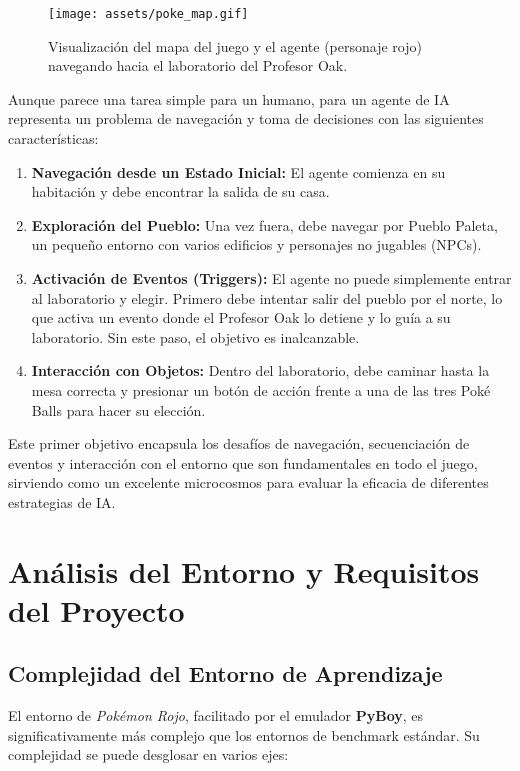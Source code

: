 \documentclass[12pt, oneside, openany]{book}
\begin{document}
\begin{figure}[H]
    \centering
    \texttt{[image: assets/poke\_map.gif]}
    \caption{Visualización del mapa del juego y el agente (personaje rojo) navegando hacia el laboratorio del Profesor Oak.}
    \label{fig:poke_map}
\end{figure}

Aunque parece una tarea simple para un humano, para un agente de IA representa un problema de navegación y toma de decisiones con las siguientes características:
\begin{enumerate}
    \item \textbf{Navegación desde un Estado Inicial:} El agente comienza en su habitación y debe encontrar la salida de su casa.
    \item \textbf{Exploración del Pueblo:} Una vez fuera, debe navegar por Pueblo Paleta, un pequeño entorno con varios edificios y personajes no jugables (NPCs).
    \item \textbf{Activación de Eventos (Triggers):} El agente no puede simplemente entrar al laboratorio y elegir. Primero debe intentar salir del pueblo por el norte, lo que activa un evento donde el Profesor Oak lo detiene y lo guía a su laboratorio. Sin este paso, el objetivo es inalcanzable.
    \item \textbf{Interacción con Objetos:} Dentro del laboratorio, debe caminar hasta la mesa correcta y presionar un botón de acción frente a una de las tres Poké Balls para hacer su elección.
\end{enumerate}

Este primer objetivo encapsula los desafíos de navegación, secuenciación de eventos y interacción con el entorno que son fundamentales en todo el juego, sirviendo como un excelente microcosmos para evaluar la eficacia de diferentes estrategias de IA.

\section{Análisis del Entorno y Requisitos del Proyecto}
\label{sec:analisis_entorno}

\subsection{Complejidad del Entorno de Aprendizaje}
El entorno de \textit{Pokémon Rojo}, facilitado por el emulador \textbf{PyBoy}, es significativamente más complejo que los entornos de benchmark estándar. Su complejidad se puede desglosar en varios ejes:
\end{document}
